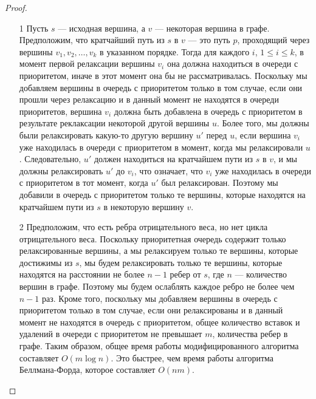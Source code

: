 \begin{proof}
\begin{itemize}
\item[]
\item[1] Пусть $s$ — исходная вершина, а $v$ — некоторая вершина в графе. Предположим, что кратчайший путь из $s$ в $v$ — это путь $p$, проходящий через вершины $v_1, v_2, \ldots, v_k$ в указанном порядке. Тогда для каждого $i$, $1\leq i\leq k$, в момент первой релаксации вершины $v_i$ она должна находиться в очереди с приоритетом, иначе в этот момент она бы не рассматривалась. Поскольку мы добавляем вершины в очередь с приоритетом только в том случае, если они прошли через релаксацию и в данный момент не находятся в очереди приоритетов, вершина $v_i$ должна быть добавлена в очередь с приоритетом в результате реклаксации некоторой другой вершины $u$. Более того, мы должны были релаксировать какую-то другую вершину $u'$ перед $u$, если вершина $v_i$ уже находилась в очереди с приоритетом в момент, когда мы релаксировали $u$. Следовательно, $u'$ должен находиться на кратчайшем пути из $s$ в $v$, и мы должны релаксировать $u'$ до $v_i$, что означает, что $v_i$ уже находилась в очереди с приоритетом в тот момент, когда $u'$ был релаксирован. Поэтому мы добавили в очередь с приоритетом только те вершины, которые находятся на кратчайшем пути из $s$ в некоторую вершину $v$.

\item[2] Предположим, что есть ребра отрицательного веса, но нет цикла отрицательного веса. Поскольку приоритетная очередь содержит только релаксированные вершины, а мы релаксируем только те вершины, которые достижимы из $s$, мы будем релаксировать только те вершины, которые находятся на расстоянии не более $n-1$ ребер от $s$, где $n$ — количество вершин в графе. Поэтому мы будем ослаблять каждое ребро не более чем $n-1$ раз. Кроме того, поскольку мы добавляем вершины в очередь с приоритетом только в том случае, если они релаксированы и в данный момент не находятся в очередь с приоритетом, общее количество вставок и удалений в очереди с приоритетом не превышает $m$, количества ребер в графе. Таким образом, общее время работы модифицированного алгоритма составляет $O(m\log n)$. Это быстрее, чем время работы алгоритма Беллмана-Форда, которое составляет $O(nm)$.


\end{itemize}
\end{proof}
